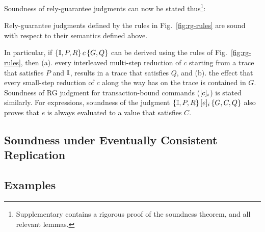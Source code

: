 Soundness of rely-guarantee judgments can now be stated
thus\footnote{Supplementary contains a rigorous proof of the soundness
theorem, and all relevant lemmas.}:
\begin{theorem}[Soundness] 
Rely-guarantee judgments defined by the rules in
Fig.~\ref{fig:rg-rules} are sound with respect to their semantics
defined above. 
\end{theorem}
\noindent In particular, if $\{\mathbb{I},P,R\}\,c\,\{G,Q\}$ can be derived using
the rules of Fig.~\ref{fig:rg-rules}, then (a). every interleaved
multi-step reduction of $c$ starting from a trace that satisfies $P$
and $\mathbb{I}$, results in a trace that satisfies $Q$, and (b). the effect
that every small-step reduction of $c$ along the way has on the trace
is contained in $G$. Soundness of RG judgment for transaction-bound
commands ($\lbrack c \rbrack_i$) is stated similarly.  For expressions,
soundness of the judgment $\{\mathbb{I},P,R\}\,\lbrack e \rbrack_i\,\{G,C,Q\}$ also
proves that $e$ is always evaluated to a value that satisfies $C$.

\subsection{Soundness under Eventually Consistent Replication}

\subsection{Examples}

